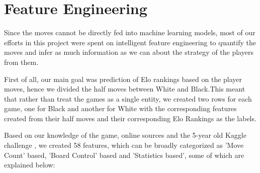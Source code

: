 \documentclass[11pt,a4paper]{article}
\begin{document}
\section{Feature Engineering}
Since the moves cannot be directly fed into machine learning models, most of our efforts in this project were spent on intelligent feature engineering to quantify the moves and infer as much information as we can about the strategy of the players from them.

First of all, our main goal was prediction of Elo rankings based on the player moves, hence we divided the half moves between White and Black.This meant that rather than treat the games as a single entity, we created two rows for each game, one for Black and another for White with the corresponding features created from their half moves and their corresponding Elo Rankings as the labels.

Based on our knowledge of the game, online sources and the 5-year old Kaggle challenge \cite{KaggleFindingElo}, we created 58 features, which can be broadly categorized as 'Move Count' based, 'Board Control' based and 'Statistics based', some of which are explained below:
\end{document}
